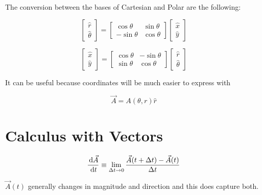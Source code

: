 The conversion between the bases of Cartesian and Polar are the following:

\begin{equation} \label{eq:polar-cartesian-basis}
	\begin{bmatrix}
		\hat r\\\hat \theta
	\end{bmatrix} = \begin{bmatrix}
		\cos\theta & \sin\theta\\
		-\sin\theta & \cos\theta
	\end{bmatrix} \begin{bmatrix}
		\hat x\\\hat y
	\end{bmatrix}
\end{equation}

\begin{equation}
	\begin{bmatrix}
		\hat x\\\hat y
	\end{bmatrix} = \begin{bmatrix}
		\cos\theta & -\sin\theta\\
		\sin\theta & \cos\theta
	\end{bmatrix} \begin{bmatrix}
		\hat r\\\hat \theta
	\end{bmatrix}
\end{equation}

\begin{remark}
	It can be useful because coordinates will be much easier to express with

	\begin{equation}
		\vec A = A(\theta, r) \hat r
	\end{equation}
\end{remark}

\section{Calculus with Vectors}
\label{sect:calc-with-vec}

\begin{equation}
	\frac{\D \vec A}{\D t} \equiv \lim_{\Delta t \to 0} \frac{\vec A(t + \Delta t) - \vec A(t)}{\Delta t}
\end{equation}

$\vec A(t)$ generally changes in magnitude and direction and this does capture both.


